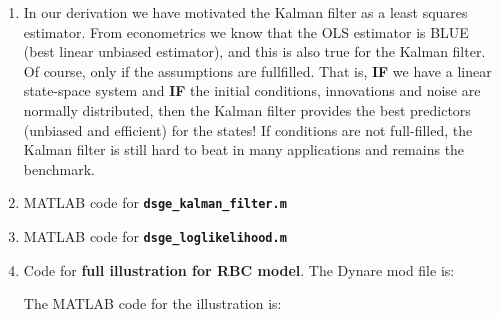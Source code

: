 \begin{enumerate}
\item In our derivation we have motivated the Kalman filter as a least squares estimator.
From econometrics we know that the OLS estimator is BLUE (best linear unbiased estimator),
  and this is also true for the Kalman filter.
Of course, only if the assumptions are fullfilled.
That is, \textbf{IF} we have a linear state-space system and \textbf{IF} the initial conditions,
  innovations and noise are normally distributed,
  then the Kalman filter provides the best predictors (unbiased and efficient) for the states!
If conditions are not full-filled, the Kalman filter is still hard to beat in many applications and remains the benchmark.

\item MATLAB code for \textbf{\texttt{dsge\_kalman\_filter.m}}


\item MATLAB code for \textbf{\texttt{dsge\_loglikelihood.m}}


\item Code for \textbf{full illustration for RBC model}.
The Dynare mod file is:


The MATLAB code for the illustration is:


%
\end{enumerate}